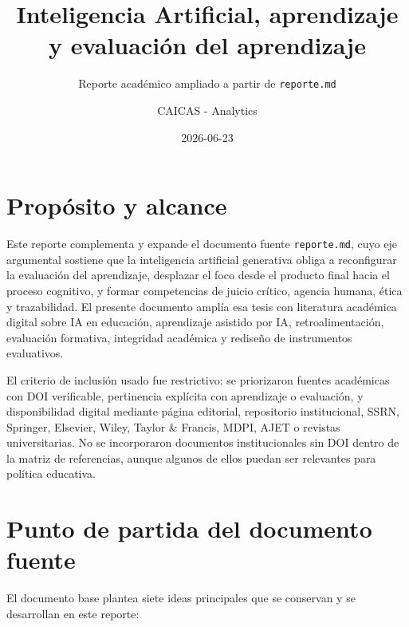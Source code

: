 \documentclass[
  spanish,
  letterpaper,
  DIV=11,
  numbers=noendperiod]{scrartcl}
\title{Inteligencia Artificial, aprendizaje y evaluación del
aprendizaje}
\subtitle{Reporte académico ampliado a partir de \texttt{reporte.md}}
\author{CAICAS - Analytics}
\date{2026-06-23}
\renewcommand*\contentsname{Tabla de contenidos}
\newcommand\contentsname{Tabla de contenidos}
\begin{document}
\maketitle

\renewcommand*\contentsname{Tabla de contenidos}
{
\hypersetup{linkcolor=}
\setcounter{tocdepth}{3}
\tableofcontents
}

\section{Propósito y alcance}\label{propuxf3sito-y-alcance}

Este reporte complementa y expande el documento fuente
\texttt{reporte.md}, cuyo eje argumental sostiene que la inteligencia
artificial generativa obliga a reconfigurar la evaluación del
aprendizaje, desplazar el foco desde el producto final hacia el proceso
cognitivo, y formar competencias de juicio crítico, agencia humana,
ética y trazabilidad. El presente documento amplía esa tesis con
literatura académica digital sobre IA en educación, aprendizaje asistido
por IA, retroalimentación, evaluación formativa, integridad académica y
rediseño de instrumentos evaluativos.

El criterio de inclusión usado fue restrictivo: se priorizaron fuentes
académicas con DOI verificable, pertinencia explícita con aprendizaje o
evaluación, y disponibilidad digital mediante página editorial,
repositorio institucional, SSRN, Springer, Elsevier, Wiley, Taylor \&
Francis, MDPI, AJET o revistas universitarias. No se incorporaron
documentos institucionales sin DOI dentro de la matriz de referencias,
aunque algunos de ellos puedan ser relevantes para política educativa.

\section{Punto de partida del documento
fuente}\label{punto-de-partida-del-documento-fuente}

El documento base plantea siete ideas principales que se conservan y se
desarrollan en este reporte:
\end{document}
